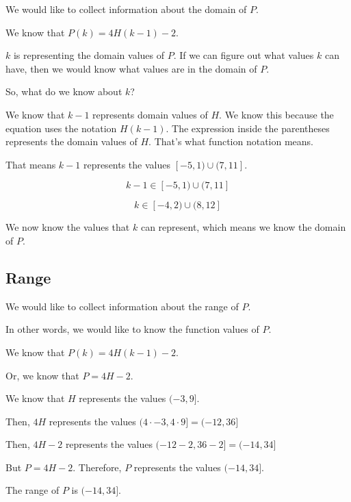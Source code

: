 \documentclass{ximera}
\begin{document}
We would like to collect information about the domain of $P$. 

We know that $P(k) = 4 H(k-1) - 2$.

$k$ is representing the domain values of $P$.  If we can figure out what values $k$ can have, then we would know what values are in the domain of $P$. 

So, what do we know about $k$? 


We know that $k-1$ represents domain values of $H$.  We know this because the equation uses the notation $H(k-1)$.  The expression inside the parentheses represents the domain values of $H$.  That's what function notation means. 


That means $k-1$ represents the values  $[-5, 1) \cup (7, 11]$.


\[
k - 1 \in [-5, 1) \cup (7, 11]
\]


\[
k \in [-4, 2) \cup (8, 12]
\]



We now know the values that $k$ can represent, which means we know the domain of $P$. 












\subsection*{Range}


We would like to collect information about the range of $P$. 

In other words, we would like to know the function values of $P$. 


We know that $P(k) = 4 H(k-1) - 2$.


Or, we know that $P = 4 H - 2$. 



We know that $H$ represents the values $(-3, 9]$. 


Then, $4 H$ represents the values $(4 \cdot -3, 4 \cdot 9] = (-12, 36]$ 



Then, $4 H - 2$ represents the values $(-12 - 2, 36 - 2] = (-14, 34]$ 


But $P = 4 H - 2$.  Therefore, $P$ represents the values $(-14, 34]$. 


The range of $P$ is $(-14, 34]$.
\end{document}
